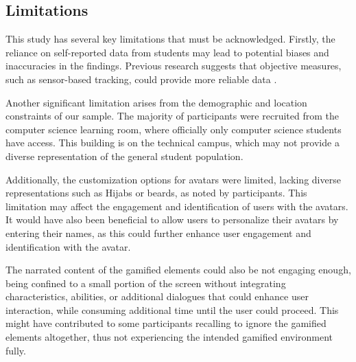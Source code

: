 

\subsection{Limitations}
This study has several key limitations that must be acknowledged.
Firstly, the reliance on self-reported data from students may lead to potential biases and inaccuracies in the findings. Previous research suggests that objective measures, such as sensor-based tracking, could provide more reliable data \parencite{woolfAffectiveTutorsAutomatic2010}.

Another significant limitation arises from the demographic and location constraints of our sample. The majority of participants were recruited from the computer science learning room, where officially only computer science students have access. This building is on the technical campus, which may not provide a diverse representation of the general student population.

Additionally, the customization options for avatars were limited, lacking diverse representations such as Hijabs or beards, as noted by participants. This limitation may affect the engagement and identification of users with the avatars. It would have also been beneficial to allow users to personalize their avatars by entering their names, as this could further enhance user engagement and identification with the avatar.

The narrated content of the gamified elements could also be not engaging enough, being confined to a small portion of the screen without integrating characteristics, abilities, or additional dialogues that could enhance user interaction, while consuming additional time until the user could proceed. This might have contributed to some participants recalling to ignore the gamified elements altogether, thus not experiencing the intended gamified environment fully.

